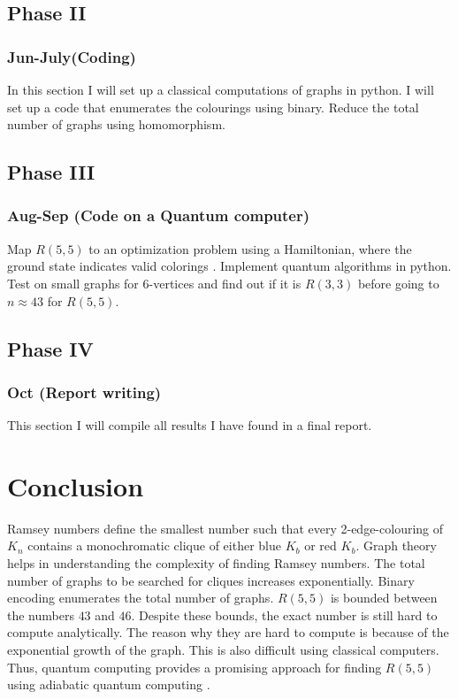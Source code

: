 \documentclass{Assignment}
\begin{document}
\subsection{Phase II}
\subsubsection*{Jun-July(Coding)}
In this section I will set up a classical computations of graphs in python.
I will set up a code that enumerates the colourings using binary.
Reduce the total number of graphs using homomorphism.
\subsection{Phase III}
\subsubsection*{Aug-Sep (Code on a Quantum computer)}
Map \( R(5,5) \) to an optimization problem using a Hamiltonian, where the ground state indicates valid colorings \cite{PhysRevA.93.032301}.
Implement quantum algorithms in python.
Test on small graphs for 6-vertices and find out if it is $R(3,3)$ before going to \( n \approx 43 \) for $R(5,5)$.
\subsection{Phase IV}
\subsubsection*{Oct (Report writing)}
This section I will compile all results I have found in a final report.
\section{Conclusion}
	Ramsey numbers define the smallest number such that every 2-edge-colouring of $K_n$ contains a monochromatic clique of either blue $K_b$ or red $K_b$.
	Graph theory helps in understanding the complexity of finding Ramsey numbers.
	The total number of graphs to be searched for cliques increases exponentially.
	Binary encoding enumerates the total number of graphs.
	$R(5,5)$ is bounded between the numbers $43$ and $46$.
	Despite these bounds, the exact number is still hard to compute analytically.
	The reason why they are hard to compute is because of the exponential growth of the graph.
	This is also difficult using classical computers.
	Thus, quantum computing provides a promising approach for finding $R(5,5)$ using adiabatic quantum computing \cite{PhysRevA.93.032301}.
	\newpage
	
\end{document}

